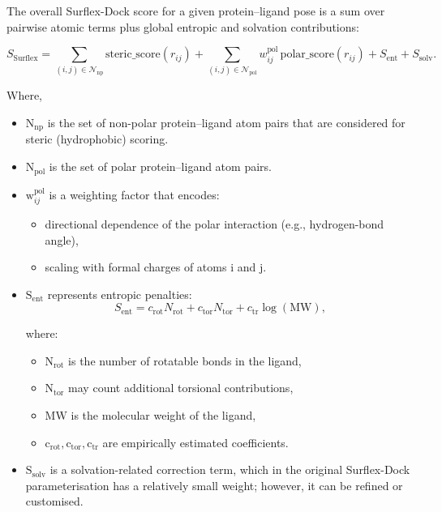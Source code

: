 \documentclass[12pt]{article}
\begin{document}
The overall Surflex-Dock score for a given protein--ligand pose is a sum over pairwise atomic terms plus global entropic and solvation contributions:\cite{CH7_Jain2007Surflex21,CH7_Jain2006NegTrain}

\begin{equation}
  S_{\textrm{Surflex}}
  =
  \sum_{(i,j) \in \mathcal{N}_{\textrm{np}}}
    \text{steric\_score}\!\left( r_{ij} \right)
  +
  \sum_{(i,j) \in \mathcal{N}_{\textrm{pol}}}
    w_{ij}^{\text{pol}} \,
    \textrm{polar\_score}\!\left( r_{ij} \right)
  +
  S_{\textrm{ent}}
  +
  S_{\textrm{solv}}.
  \label{eq:surflex_total}
\end{equation}

Where, 
\begin{itemize}
  \item $\textrm{N}_{\textrm{np}}$ is the set of non-polar protein--ligand atom pairs that are considered for steric (hydrophobic) scoring.
  \item $\textrm{N}_{\textrm{pol}}$ is the set of polar protein--ligand atom pairs.
  \item $\textrm{w}_{ij}^{\textrm{pol}}$ is a weighting factor that encodes:
  \begin{itemize}
    \item directional dependence of the polar interaction (e.g., hydrogen-bond angle),
    \item scaling with formal charges of atoms i and j.
  \end{itemize}
  \item $\textrm{S}_{\textrm{ent}}$ represents entropic penalties:
  \begin{equation}
    S_{\textrm{ent}}
    =
    c_{\textrm{rot}} N_{\textrm{rot}}
    +
    c_{\textrm{tor}} N_{\textrm{tor}}
    +
    c_{\textrm{tr}} \log\!\left(\textrm{MW}\right),
    \label{eq:entropic}
  \end{equation}

  where:
  \begin{itemize}
    \item $\textrm{N}_{\textrm{rot}}$ is the number of rotatable bonds in the ligand,
    \item $\textrm{N}_{\textrm{tor}}$ may count additional torsional contributions,
    \item $\textrm{MW}$ is the molecular weight of the ligand,
    \item $\textrm{c}_{\textrm{rot}}, \textrm{c}_{\textrm{tor}}, \textrm{c}_{\textrm{tr}}$ are empirically estimated coefficients.
  \end{itemize}
  \item $\textrm{S}_{\textrm{solv}}$ is a solvation-related correction term, which in the original Surflex-Dock parameterisation has a relatively small weight; however, it can be refined or customised\cite{CH7_Jain2007Surflex21}.
\end{itemize}
\end{document}
